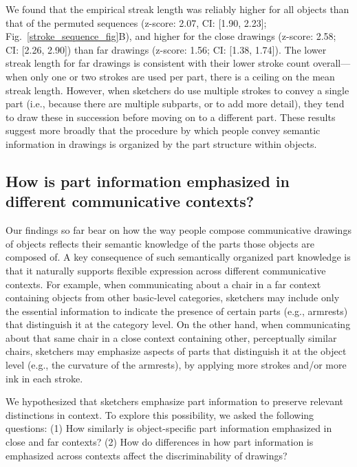 \documentclass[10pt,letterpaper]{article}
\begin{document}
We found that the empirical streak length was reliably higher for all objects than that of the permuted sequences (z-score: 2.07, CI: [1.90, 2.23]; Fig.~\ref{stroke_sequence_fig}B), and higher for the close drawings (z-score: 2.58; CI: [2.26, 2.90]) than far drawings (z-score: 1.56; CI: [1.38, 1.74]).
The lower streak length for far drawings is consistent with their lower stroke count overall---when only one or two strokes are used per part, there is a ceiling on the mean streak length. 
However, when sketchers do use multiple strokes to convey a single part (i.e., because there are multiple subparts, or to add more detail), they tend to draw these in succession before moving on to a different part.
These results suggest more broadly that the procedure by which people convey semantic information in drawings is organized by the part structure within objects.

\subsection{How is part information emphasized in different communicative contexts?}

Our findings so far bear on how the way people compose communicative drawings of objects reflects their semantic knowledge of the parts those objects are composed of.
A key consequence of such semantically organized part knowledge is that it naturally supports flexible expression across different communicative contexts. 
For example, when communicating about a chair in a far context containing objects from other basic-level categories, sketchers may include only the essential information to indicate the presence of certain parts (e.g., armrests) that distinguish it at the category level. 
On the other hand, when communicating about that same chair in a close context containing other, perceptually similar chairs, sketchers may emphasize aspects of parts that distinguish it at the object level (e.g., the curvature of the armrests), by applying more strokes and/or more ink in each stroke.

We hypothesized that sketchers emphasize part information to preserve relevant distinctions in context. 
To explore this possibility, we asked the following questions: 
(1) How similarly is object-specific part information emphasized in close and far contexts? 
(2) How do differences in how part information is emphasized across contexts affect the discriminability of drawings?
\end{document}
